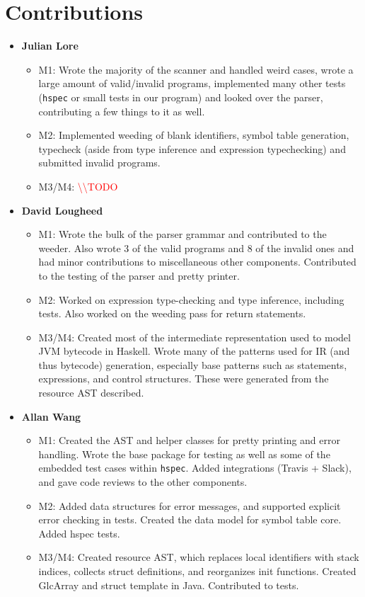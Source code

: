 \documentclass[11pt]{article}
\newcommand{\todo}[0]{\textcolor{red}{\textbackslash\textbackslash TODO \ }}
\begin{document}
\section{Contributions}
\begin{itemize}
	\item \textbf{Julian Lore}
	\begin{itemize}
		\item M1: Wrote the majority of the scanner and
		handled weird cases, wrote a large amount of valid/invalid programs,
		implemented many other tests (\texttt{hspec} or small tests in our
		program) and looked over the parser, contributing a few things to it
		as well.
		\item M2: Implemented weeding of blank identifiers,
		symbol table generation, typecheck (aside from type inference and
		expression typechecking) and submitted invalid programs.
		\item M3/M4: \todo
	\end{itemize}
	\item \textbf{David Lougheed}
	\begin{itemize}
		\item M1: Wrote the bulk of the parser grammar
		and contributed to the weeder. Also wrote 3 of the valid programs
		and 8 of the invalid ones and had minor contributions to
		miscellaneous other components.  Contributed to the testing of the
		parser and pretty printer.
		\item M2: Worked on expression type-checking and
		type inference, including tests. Also worked on the weeding pass for
		return statements.
		\item M3/M4: Created most of the intermediate representation used to
		model JVM bytecode in Haskell. Wrote many of the patterns used for IR
		(and thus bytecode) generation, especially base patterns such as
		statements, expressions, and control structures. These were generated
		from the resource AST described.
	\end{itemize}
	\item \textbf{Allan Wang}
	\begin{itemize}
		\item M1: Created the AST and helper classes for
		pretty printing and error handling.  Wrote the base package for
		testing as well as some of the embedded test cases within
		\texttt{hspec}.  Added integrations (Travis + Slack), and gave code
		reviews to the other components.
		\item M2: Added data structures for error messages,
		and supported explicit error checking in tests. Created the data
		model for symbol table core. Added hspec tests.
		\item M3/M4: Created resource AST, which replaces local identifiers with stack indices, collects struct definitions, and reorganizes init functions. Created GlcArray and struct template in Java. Contributed to tests.
	\end{itemize}
\end{itemize}

\newpage

 
\end{document}
